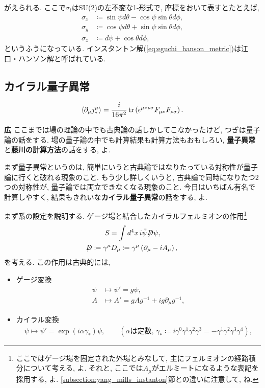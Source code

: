 \documentclass{ltjsarticle}
\theoremstyle{definition}
\def\slash#1{\!\!\not\!\!#1}
\def\dsla{\,\slash{D}}
\begin{document}
がえられる. ここで$\sigma_i$はSU(2)の左不変な1-形式で, 座標をおいて表すとたとえば,
\begin{align}
  \sigma_x&\coloneqq\sin\psi d\theta-\cos\psi\sin\theta d\phi,\\
  \sigma_y&\coloneqq\cos\psi d\theta+\sin\psi\sin\theta d\phi,\\
  \sigma_z&\coloneqq d\psi+\cos\theta d\phi,
\end{align}
というふうになっている. インスタントン解(\ref{eq:eguchi_hanson_metric})は江口・ハンソン解と呼ばれている.

\subsection{カイラル量子異常\label{subsection:chiral_anomaly}}
\begin{tcolorbox}
  \begin{gather}
    \langle\partial_\mu j^\mu_\ast\rangle=\frac i{16\pi^2}\tr\left(\epsilon^{\mu\nu\rho\sigma}F_{\mu\nu}F_{\rho\sigma}\right).\label{eq:chiral_anomaly_yang_mills}
  \end{gather}
\end{tcolorbox}
\noindent
\textbf{広} ここまでは場の理論の中でも古典論の話しかしてこなかったけど, つぎは量子論の話をする. 場の量子論の中でも計算結果も計算方法もおもしろい, \textbf{量子異常}と\textbf{藤川の計算方法}の話をする, よ.\par
まず量子異常というのは, 簡単にいうと古典論ではなりたっている対称性が量子論に行くと破れる現象のこと. もう少し詳しくいうと, 古典論で同時になりたつ2つの対称性が, 量子論では両立できなくなる現象のこと. 今日はいちばん有名で計算しやすく, 結果もきれいな\textbf{カイラル量子異常}の話をする, よ.\par
まず系の設定を説明する. ゲージ場と結合したカイラルフェルミオンの作用\footnote{ここではゲージ場を固定された外場とみなして, 主にフェルミオンの経路積分について考える, よ. それと, ここでは$A_\mu$がエルミートになるような表記を採用する, よ. \ref{subsection:yang_mills_instanton}節との違いに注意して, ね.}
\begin{gather}
  S=\int d^4x\,i\bar\psi\dsla\psi,\\
  \dsla\coloneqq\gamma^\mu D_\mu\coloneqq\gamma^\mu\left(\partial_\mu-iA_\mu\right),
\end{gather}
を考える. この作用は古典的には,
\begin{itemize}
  \item ゲージ変換
  \begin{align}
    \psi&\mapsto\psi'=g\psi,\\
    A&\mapsto A'=gAg^{-1}+ig\partial_\mu g^{-1},
  \end{align}
  \item カイラル変換
  \begin{gather}
    \psi\mapsto\psi'=\exp\left(i\alpha\gamma_\ast\right)\psi,\qquad(\text{$\alpha$は定数, }\gamma_\ast\coloneqq i\gamma^0\gamma^1\gamma^2\gamma^3=-\gamma^1\gamma^2\gamma^3\gamma^4),
  \end{gather}
\end{itemize}
\end{document}
